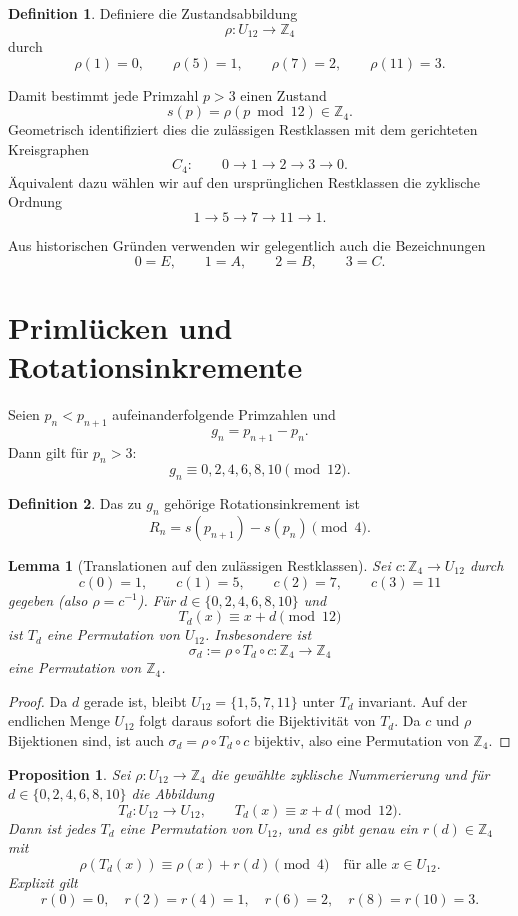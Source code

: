 \documentclass[11pt]{article}
\newtheorem{lemma}{Lemma}
\newtheorem{proposition}{Proposition}
\theoremstyle{definition}
\newtheorem{definition}{Definition}
\begin{document}
\begin{definition}
Definiere die Zustandsabbildung
\[
\rho:U_{12}\rightarrow \mathbb{Z}_4
\]
durch
\[
\rho(1)=0,\qquad
\rho(5)=1,\qquad
\rho(7)=2,\qquad
\rho(11)=3.
\]
\end{definition}

Damit bestimmt jede Primzahl $p>3$ einen Zustand
\[
s(p)=\rho(p\bmod 12)\in\mathbb{Z}_4.
\]
Geometrisch identifiziert dies die zul\"assigen Restklassen mit dem gerichteten Kreisgraphen
\[
C_4:\qquad 0\rightarrow1\rightarrow2\rightarrow3\rightarrow0.
\]
\"Aquivalent dazu w\"ahlen wir auf den urspr\"unglichen Restklassen die zyklische Ordnung
\[
1\to5\to7\to11\to1.
\]

Aus historischen Gr\"unden verwenden wir gelegentlich auch die Bezeichnungen
\[
0=E,\qquad 1=A,\qquad 2=B,\qquad 3=C.
\]

\section{Priml\"ucken und Rotationsinkremente}

Seien $p_n<p_{n+1}$ aufeinanderfolgende Primzahlen und
\[
g_n=p_{n+1}-p_n.
\]
Dann gilt f\"ur $p_n>3$:
\[
g_n\equiv 0,2,4,6,8,10 \pmod{12}.
\]

\begin{definition}
Das zu $g_n$ geh\"orige Rotationsinkrement ist
\[
R_n=s(p_{n+1})-s(p_n)\pmod 4.
\]
\end{definition}

\begin{lemma}[Translationen auf den zul\"assigen Restklassen]
Sei $c:\mathbb{Z}_4\to U_{12}$ durch
\[
c(0)=1,\qquad c(1)=5,\qquad c(2)=7,\qquad c(3)=11
\]
gegeben (also $\rho=c^{-1}$).
F\"ur $d\in\{0,2,4,6,8,10\}$ und
\[
T_d(x)\equiv x+d\pmod{12}
\]
ist $T_d$ eine Permutation von $U_{12}$.
Insbesondere ist
\[
\sigma_d:=\rho\circ T_d\circ c:\mathbb{Z}_4\to\mathbb{Z}_4
\]
eine Permutation von $\mathbb{Z}_4$.
\end{lemma}

\begin{proof}
Da $d$ gerade ist, bleibt $U_{12}=\{1,5,7,11\}$ unter $T_d$ invariant.
Auf der endlichen Menge $U_{12}$ folgt daraus sofort die Bijektivit\"at von $T_d$.
Da $c$ und $\rho$ Bijektionen sind, ist auch
$\sigma_d=\rho\circ T_d\circ c$ bijektiv, also eine Permutation von $\mathbb{Z}_4$.
\end{proof}

\begin{proposition}
Sei $\rho:U_{12}\to\mathbb{Z}_4$ die gew\"ahlte zyklische Nummerierung und
f\"ur $d\in\{0,2,4,6,8,10\}$ die Abbildung
\[
T_d:U_{12}\to U_{12},\qquad T_d(x)\equiv x+d\pmod{12}.
\]
Dann ist jedes $T_d$ eine Permutation von $U_{12}$, und es gibt genau ein $r(d)\in\mathbb{Z}_4$ mit
\[
\rho(T_d(x))\equiv \rho(x)+r(d)\pmod 4
\quad\text{f\"ur alle }x\in U_{12}.
\]
Explizit gilt
\[
r(0)=0,\quad r(2)=r(4)=1,\quad r(6)=2,\quad r(8)=r(10)=3.
\]
\end{proposition}
\end{document}
